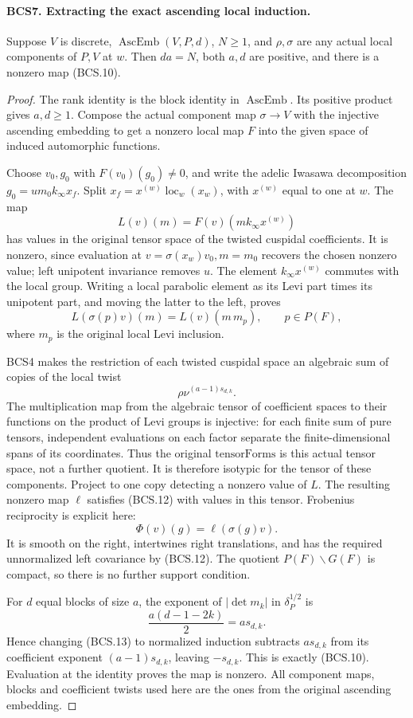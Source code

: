 \paragraph{BCS7. Extracting the exact ascending local induction.}
\label{claim:BCS7}
\leavevmode\par
Suppose \(V\) is discrete, \(\operatorname{AscEmb}(V,P,d)\),
\(N\ge1\), and \(\rho,\sigma\) are any actual local
components of \(P,V\) at \(w\).  Then \(da=N\), both
\(a,d\) are positive, and there is a nonzero map (BCS.10).
\begin{proof}
The rank identity is the block identity in \(\operatorname{AscEmb}\).
Its positive product gives \(a,d\ge1\).  Compose the actual
component map \(\sigma\to V\) with the injective ascending
embedding to get a nonzero local map \(F\) into the given space
of induced automorphic functions.

Choose \(v_0,g_0\) with \(F(v_0)(g_0)\ne0\), and write the
adelic Iwasawa decomposition
\(g_0=u m_0 k_\infty x_f\).  Split
\(x_f=x^{(w)}\operatorname{loc}_w(x_w)\), with
\(x^{(w)}\) equal to one at \(w\).  The map
\[
 L(v)(m)=F(v)(m k_\infty x^{(w)})
 \tag{BCS.11}
\]
has values in the original tensor space of the twisted cuspidal
coefficients.  It is nonzero, since evaluation at
\(v=\sigma(x_w)v_0,m=m_0\) recovers the chosen nonzero value;
left unipotent invariance removes \(u\).  The element
\(k_\infty x^{(w)}\) commutes with the local group.  Writing a
local parabolic element as its Levi part times its unipotent part,
and moving the latter to the left, proves
\[
 L(\sigma(p)v)(m)=L(v)(m\,m_p),\qquad p\in P(F),
 \tag{BCS.12}
\]
where \(m_p\) is the original local Levi inclusion.

BCS4 makes the restriction of each twisted cuspidal space an
algebraic sum of copies of the local twist
\[
                         \rho\nu^{(a-1)s_{d,k}}.
\]
The multiplication map from the algebraic tensor of coefficient
spaces to their functions on the product of Levi groups is injective:
for each finite sum of pure tensors, independent evaluations on each
factor separate the finite-dimensional spans of its coordinates.
Thus the original \(\mathrm{tensorForms}\) is this actual tensor
space, not a further quotient.  It is therefore
isotypic for the tensor of these components.  Project to one copy
detecting a nonzero value of \(L\).  The resulting nonzero map
\(\ell\) satisfies (BCS.12) with values in this tensor.
Frobenius reciprocity is explicit here:
\[
                   \Phi(v)(g)=\ell(\sigma(g)v).
 \tag{BCS.13}
\]
It is smooth on the right, intertwines right translations, and has
the required unnormalized left covariance by (BCS.12).  The quotient
\(P(F)\backslash G(F)\) is compact, so there is no further
support condition.

For \(d\) equal blocks of size \(a\), the exponent of
\(|\det m_k|\) in \(\delta_P^{1/2}\) is
\[
 \frac{a(d-1-2k)}2=a s_{d,k}.
 \tag{BCS.14}
\]
Hence changing (BCS.13) to normalized induction subtracts
\(a s_{d,k}\) from its coefficient exponent
\((a-1)s_{d,k}\), leaving \(-s_{d,k}\).  This is exactly
(BCS.10).  Evaluation at the identity proves the map is nonzero.
All component maps, blocks and coefficient twists used here are the
ones from the original ascending embedding.
\end{proof}
